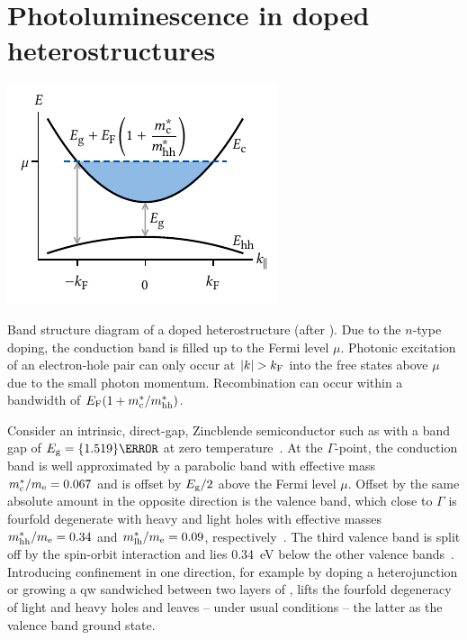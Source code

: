 \section{Photoluminescence in doped \GaAsAlGaAs heterostructures}\label{sec:exp:theory:pl}
\begin{marginfigure}
    \centering
    \includegraphics{img/pdf/experiment/2deg_sketch}
    \caption[]{
        Band structure diagram of a doped heterostructure (after ).
        Due to the $n$-type doping, the conduction band is filled up to the Fermi level $\mu$.
        Photonic excitation of an electron-hole pair can only occur at $\abs{k} > k_{\mathrm{F}}$ into the free states above $\mu$ due to the small photon momentum.
        Recombination can occur within a bandwidth of $E_{\mathrm{F}}(1 + m^\ast_{\mathrm{c}}/m^\ast_{\mathrm{hh}})$.
    }
    \label{fig:exp:theory:bandstructure:doped}
\end{marginfigure}
Consider an intrinsic, direct-gap, Zincblende semiconductor such as  with a band gap of $E_{\mr{g}} = \qty{1.519}{\electronvolt}$ at zero temperature~\cite{Vurgaftman2001}.
At the $\Gamma$-point, the conduction band is well approximated by a parabolic band with effective mass $m^\ast_{\mathrm{c}}/m_{\mathrm{e}} = 0.067$ and is offset by $E_{\mathrm{g}}/2$ above the Fermi level $\mu$.
Offset by the same absolute amount in the opposite direction is the valence band, which close to $\Gamma$ is fourfold degenerate with heavy and light holes with effective masses $m^{\ast}_{\mathrm{hh}}/m_{\mathrm{e}} = 0.34$ and $m^{\ast}_{\mathrm{lh}}/m_{\mathrm{e}} = 0.09$, respectively~\cite{Miller1984a}.
The third valence band
is split off by the spin-orbit interaction and lies \qty{0.34}{\electronvolt} below the other valence bands~\cite{Davies2009}.
Introducing confinement in one direction, for example by doping a \GaAsAlGaAs heterojunction or growing a  \gls{qw} sandwiched between two layers of , lifts the fourfold degeneracy of light and heavy holes and leaves -- under usual conditions -- the latter as the valence band ground state.

